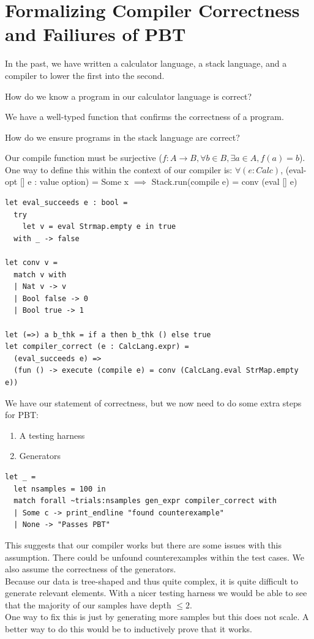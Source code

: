 \section{Formalizing Compiler Correctness and Failiures of PBT}
In the past, we have written a calculator language, a stack language, and a compiler to lower the first into the second.
\begin{question}
  How do we know a program in our calculator language is correct?
\end{question}
We have a well-typed function that confirms the correctness of a program.
\begin{question}
  How do we ensure programs in the stack language are correct?
\end{question}
Our compile function must be surjective ($f: A \to B, \forall b \in B, \exists a \in A, f(a) = b$).
\\
One way to define this within the context of our compiler is: $\forall (e : Calc)$, (eval-opt [] e : value option) = Some x $\implies$ Stack.run(compile e) = conv (eval [] e)
\begin{lstlisting}
let eval_succeeds e : bool =
  try
    let v = eval Strmap.empty e in true
  with _ -> false

let conv v =
  match v with
  | Nat v -> v
  | Bool false -> 0
  | Bool true -> 1

let (=>) a b_thk = if a then b_thk () else true  
let compiler_correct (e : CalcLang.expr) =
  (eval_succeeds e) =>
  (fun () -> execute (compile e) = conv (CalcLang.eval StrMap.empty e))
\end{lstlisting}
We have our statement of correctness, but we now need to do some extra steps for PBT:
\begin{enumerate}
  \item A testing harness
  \item Generators
\end{enumerate}
\begin{lstlisting}
let _ =
  let nsamples = 100 in
  match forall ~trials:nsamples gen_expr compiler_correct with
  | Some c -> print_endline "found counterexample"
  | None -> "Passes PBT"
\end{lstlisting}
This suggests that our compiler works but there are some issues with this assumption. There could be unfound counterexamples within the test cases. We also assume the correctness of the generators.
\\
Because our data is tree-shaped and thus quite complex, it is quite difficult to generate relevant elements. With a nicer testing harness we would be able to see that the majority of our samples have depth $\leq 2$.
\\
One way to fix this is just by generating more samples but this does not scale. A better way to do this would be to inductively prove that it works.